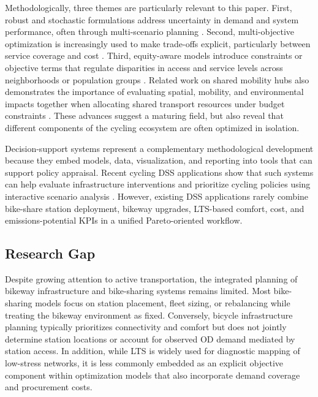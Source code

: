 \documentclass[preprint,authoryear,10pt]{elsarticle}
\begin{document}
Methodologically, three themes are particularly relevant to this paper. First, robust and stochastic formulations address uncertainty in demand and system performance, often through multi-scenario planning \citep{jin2020Robustbikesharingstations, yan2017Rentalbikelocation}. Second, multi-objective optimization is increasingly used to make trade-offs explicit, particularly between service coverage and cost \citep{vishkaei2021Biobjectiveoptimizationcustomers, fan2024Takingmultimodalapproach}. Third, equity-aware models introduce constraints or objective terms that regulate disparities in access and service levels across neighborhoods or population groups \citep{caggiani2020approachmodelingbikesharing, duran-rodas2021DemandEquityDARE, behbahani2019conceptualframeworkformulate}. Related work on shared mobility hubs also demonstrates the importance of evaluating spatial, mobility, and environmental impacts together when allocating shared transport resources under budget constraints \citep{xanthopoulosOptimizationLocationCapacity2024a}. These advances suggest a maturing field, but also reveal that different components of the cycling ecosystem are often optimized in isolation.

Decision-support systems represent a complementary methodological development because they embed models, data, visualization, and reporting into tools that can support policy appraisal. Recent cycling DSS applications show that such systems can help evaluate infrastructure interventions and prioritize cycling policies using interactive scenario analysis \citep{silvestriCyclabilityDSS2024}. However, existing DSS applications rarely combine bike-share station deployment, bikeway upgrades, LTS-based comfort, cost, and emissions-potential KPIs in a unified Pareto-oriented workflow.

\subsection{Research Gap}

Despite growing attention to active transportation, the integrated planning of bikeway infrastructure and bike-sharing systems remains limited. Most bike-sharing models focus on station placement, fleet sizing, or rebalancing while treating the bikeway environment as fixed. Conversely, bicycle infrastructure planning typically prioritizes connectivity and comfort but does not jointly determine station locations or account for observed OD demand mediated by station access. In addition, while LTS is widely used for diagnostic mapping of low-stress networks, it is less commonly embedded as an explicit objective component within optimization models that also incorporate demand coverage and procurement costs.
\end{document}
